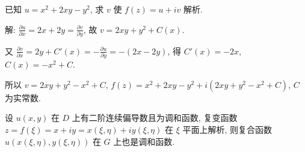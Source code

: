 \documentclass[theorem=false,mathfont=none,openany,sub3section]{easybook}
\begin{document}
\begin{example}
  已知 $u=x^{2}+2xy-y^{2}$, 求 $v$ 使 $f(z)=u+iv$ 解析.\par
  解: $\frac{\partial u}{\partial x}=2x+2y=\frac{\partial v}{\partial y}$, 故 $v=2xy+y^{2}+C(x)$.\par
  又 $\frac{\partial v}{\partial x}=2y+C'(x)=-\frac{\partial u}{\partial y}=-(2x-2y)$, 得 $C'(x)=-2x$, $C(x)=-x^{2}+C$.\par
  所以 $v=2xy+y^{2}-x^{2}+C$, $f(z)=x^{2}+2xy-y^{2}+i(2xy+y^{2}-x^{2}+C)$, $C$ 为实常数.
\end{example}

\begin{example}
  设 $u(x,y)$ 在 $D$ 上有二阶连续偏导数且为调和函数, 复变函数 $z=f(\xi)=x+iy=x(\xi,\eta)+iy(\xi,\eta)$ 在 $\xi$ 平面上解析, 则复合函数 $u(x(\xi,\eta),y(\xi,\eta))$ 在 $G$ 上也是调和函数.
\end{example}
\end{document}
